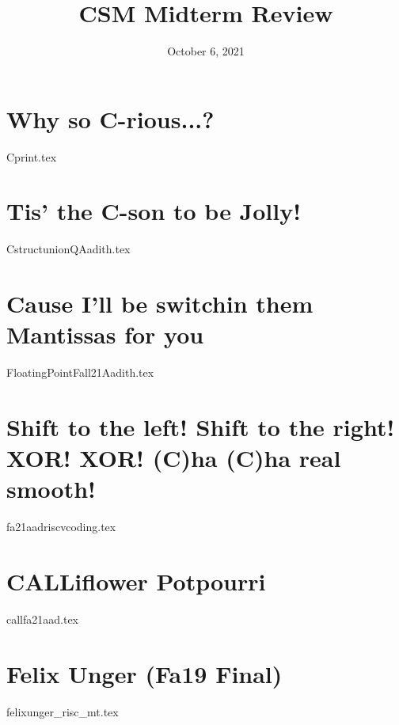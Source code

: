 \documentclass[11pt]{exam}
\title{CSM Midterm Review}
\date{October 6, 2021}
\begin{document}
\maketitle

\section{Why so C-rious...?}
\begin{questions}
{Cprint.tex}
\end{questions}
\pagebreak

\section{Tis' the C-son to be Jolly!}
\begin{questions}
{CstructunionQAadith.tex}
\end{questions}
\pagebreak


\section{Cause I'll be switchin them Mantissas for you }
\begin{questions}
{FloatingPointFall21Aadith.tex}
\end{questions}
\pagebreak

\section{Shift to the left! Shift to the right! XOR! XOR! (C)ha (C)ha real smooth!}
\begin{questions}
{fa21aadriscvcoding.tex}
\end{questions}
\pagebreak

\section{CALLiflower Potpourri}
\begin{questions}
{callfa21aad.tex}
\end{questions}
\pagebreak

\section{Felix Unger (Fa19 Final)}
\begin{questions}
{felixunger_risc_mt.tex}
\end{questions}
\newpage
\end{document}
